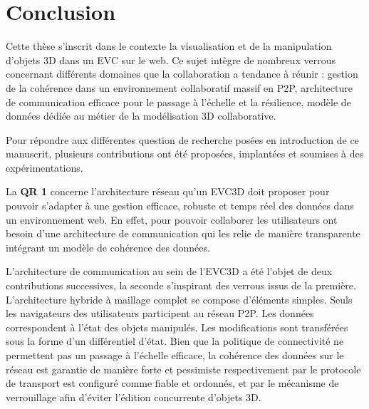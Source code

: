 \chapter{Conclusion}
\chaptertable

Cette thèse s'inscrit dans le contexte la visualisation et de la manipulation d'objets 
3D dans un \gls{EVC} sur le web. Ce sujet intègre de nombreux verrous 
concernant différents domaines que la collaboration a tendance à réunir : gestion 
de la cohérence dans un environnement collaboratif massif en \gls{P2P}, 
architecture de communication efficace pour le passage à l'échelle et la résilience, 
modèle de données dédiée au métier de la modélisation 3D collaborative. 

Pour répondre aux différentes question de 
recherche posées en introduction de ce manuscrit, plusieurs contributions ont été 
proposées, implantées et soumises à des expérimentations. 

La \textbf{QR 1} concerne l'architecture réseau qu'un \gls{EVC3D} doit proposer 
pour 
pouvoir s'adapter à une gestion efficace, robuste et temps réel des données dans 
un environnement web. En effet, pour pouvoir collaborer les utilisateurs ont besoin 
d'une architecture de communication qui les relie de manière transparente 
intégrant un modèle de cohérence des données. 

L'architecture de communication au sein de l'\gls{EVC3D} a été l'objet de deux 
contributions successives, la seconde s'inspirant des verrous issus de la 
première. 
L'architecture hybride à maillage complet se compose d'éléments 
simples. 
Seuls 
les navigateurs des utilisateurs participent au réseau \gls{P2P}. Les données 
correspondent à l'état des objets manipulés. Les modifications sont transférées 
sous la forme d'un différentiel d'état. Bien que la politique de connectivité ne 
permettent pas un passage à l'échelle efficace, la cohérence des données sur le 
réseau est garantie de manière forte et pessimiste respectivement par le protocole 
de transport est configuré comme fiable et ordonnés, et par le mécanisme de 
verrouillage afin d'éviter l'édition concurrente d'objets 3D.

